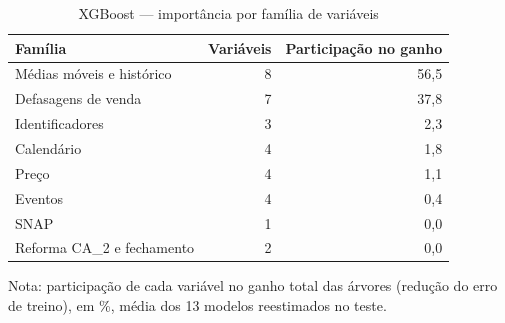\begin{table}[htbp]
\centering
\small
\caption{XGBoost — importância por família de variáveis}
\label{tab:xgb_importancia_familias}
\begin{tabular}{lrr}
\toprule
Família & Variáveis & Participação no ganho \\
\midrule
Médias móveis e histórico & 8 & 56,5 \\
Defasagens de venda & 7 & 37,8 \\
Identificadores & 3 & 2,3 \\
Calendário & 4 & 1,8 \\
Preço & 4 & 1,1 \\
Eventos & 4 & 0,4 \\
SNAP & 1 & 0,0 \\
Reforma CA\_2 e fechamento & 2 & 0,0 \\
\bottomrule
\end{tabular}
\par\smallskip
{\footnotesize Nota: participação de cada variável no ganho total das árvores (redução do erro de treino), em \%, média dos 13 modelos reestimados no teste.}
\end{table}
